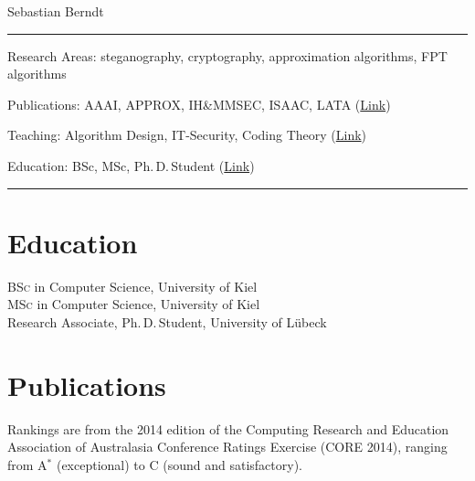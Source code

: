 \documentclass[10pt, a4paper]{article}
\newcommand{\years}[1]{\marginnote{\scriptsize #1}}
\begin{document}
{\LARGE Sebastian Berndt}\\[2mm]
\hrule
\vspace{2mm}
{\large Research Areas:}
steganography, cryptography, approximation algorithms, \textsc{FPT}
algorithms

{\large Publications:} AAAI, APPROX, IH{\&}MMSEC, ISAAC, LATA
(\hyperref[publications]{Link})

{\large Teaching:} Algorithm Design, IT-Security, Coding Theory
(\hyperref[teaching]{Link})

{\large Education:} BSc, MSc, Ph.\,D.\,Student
(\hyperref[education]{Link})\\[-1mm]
\hrule
\vfill








\section*{Education}
\label{education}
\years{2010}\textsc{BSc} in Computer Science, University of Kiel\\
\years{2012}\textsc{MSc} in Computer Science, University of Kiel\\
\years{2012--}Research Associate, Ph.\,D.\,Student, University of Lübeck


\section*{Publications}
\label{publications}
 Rankings are from the 2014 edition of the Computing Research
and Education Association of Australasia Conference Ratings Exercise (CORE 2014),
ranging from A$^{*}$ (exceptional) to C (sound and satisfactory).\\[.4cm]
\end{document}
